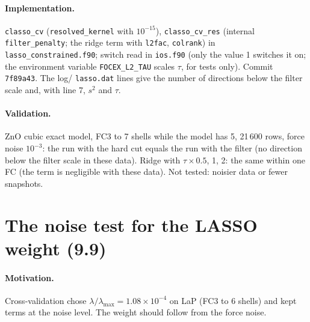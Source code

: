 \documentclass[11pt,a4paper]{article}
\newcommand{\code}[1]{\texttt{#1}}
\begin{document}
\paragraph{Implementation.} \code{classo\_cv} (\code{resolved\_kernel} with $10^{-15}$),
\code{classo\_cv\_res} (internal \code{filter\_penalty}; the ridge term with \code{l2fac}, \code{colrank}) in
\code{lasso\_constrained.f90}; switch read in \code{ios.f90} (only the value 1 switches it on; the
environment variable \code{FOCEX\_L2\_TAU} scales $\tau$, for tests only). Commit \code{7f89a43}. The log/
\code{lasso.dat} lines give the number of directions below the filter scale and, with line 7, $s^2$ and $\tau$.

\paragraph{Validation.} ZnO cubic exact model, FC3 to 7 shells while the model has 5, 21\,600 rows, force noise
$10^{-3}$: the run with the hard cut equals the run with the filter (no direction below the filter scale in
these data). Ridge with $\tau\times0.5$, 1, 2: the same within one FC (the term is negligible with these data).
Not tested: noisier data or fewer snapshots.

\section{The noise test for the LASSO weight (9.9)}\label{sec:noisetest}
\paragraph{Motivation.} Cross-validation chose $\lambda/\lambda_{\max}=1.08\times10^{-4}$ on LaP (FC3 to 6 shells) and kept terms at
the noise level. The weight should follow from the force noise.
\end{document}
